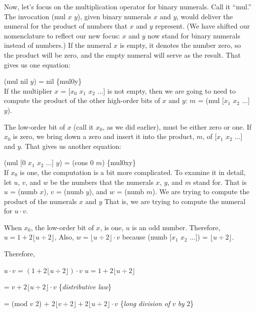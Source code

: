 Now, let's focus on the multiplication operator for binary numerals.
Call it ``mul.'' The invocation (mul $x$ $y$),
given binary numerals $x$ and $y$, would
deliver the numeral for the product of numbers that $x$ and $y$ represent.
(We have shifted our nomenclature to reflect our new focus:
$x$ and $y$ now stand for binary numerals
instead of numbers.)
If the numeral $x$ is empty, it denotes the number zero, so the product
will be zero, and the empty numeral will serve as the result.
That gives us one equation:

\hspace{2cm} (mul nil $y$) = nil \hspace{2cm} \hfill \{mul0y\}
\\

If the multiplier $x$ = [$x_0$ $x_1$ $x_2$ ...] is not empty,
then we are going to need to compute the product of the other
high-order bits of $x$ and $y$: $m$ = (mul [$x_1$ $x_2$ ...] $y$).

The low-order bit of $x$ (call it $x_0$, as we did earlier),
must be either zero or one.
If $x_0$ is zero, we bring down a zero and insert it into the product, $m$,
of [$x_1$ $x_2$ ...] and $y$. That gives us another equation:

\hspace{2cm} (mul [0 $x_1$ $x_2$ ...] $y$) = (cons 0 $m$) \hfill \{mul0xy\}
\\

If $x_0$ is one, the computation is a bit more complicated.
To examine it in detail, let $u$, $v$, and $w$ be the numbers
that the numerals $x$, $y$, and $m$ stand for.
That is $u$ = (numb $x$), $v$ = (numb $y$), and $w$ = (numb $m$).
We are trying to compute the product of the numerals $x$ and $y$
That is, we are trying to compute the numeral for $u \cdot v$.

When $x_0$, the low-order bit of $x$, is one, $u$ is an odd number.
Therefore, $u = 1 + 2 \lfloor u \div 2 \rfloor$,
Also, $w = \lfloor u \div 2 \rfloor \cdot v$
because (numb [$x_1$ $x_2$ ...]) = $\lfloor u \div 2 \rfloor$.

Therefore,

\hspace{1cm} $u \cdot v$ = $(1 + 2 \lfloor u \div 2 \rfloor) \cdot v$
\hfill $u = 1 + 2 \lfloor u \div 2 \rfloor$

\hspace{1.7cm} = $v + 2 \lfloor u \div 2 \rfloor \cdot v$
\hfill \{\emph{distributive law}\}

\hspace{1.7cm} = (mod $v$ 2) + $2 \lfloor v \div 2 \rfloor + 2 \lfloor u \div 2 \rfloor \cdot v$
\hfill \{\emph{long division of} $v$ \emph{by} 2\}

